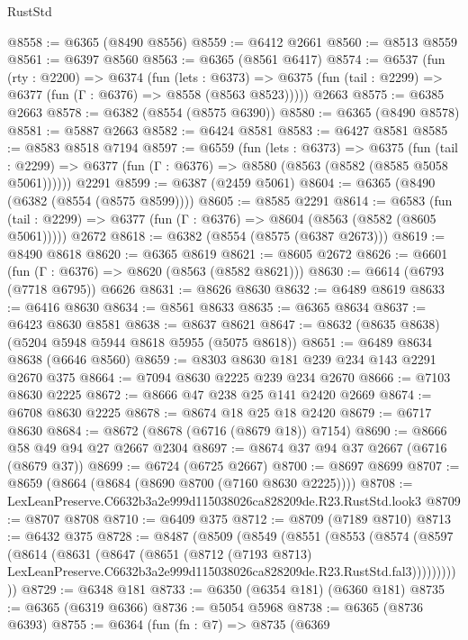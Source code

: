 \begin{lexlean}{RustStd}
\begin{coremodule}
@8558 := @6365 (@8490 @8556)
@8559 := @6412 @2661
@8560 := @8513 @8559
@8561 := @6397 @8560
@8563 := @6365 (@8561 @6417)
@8574 := @6537
    (fun (rty : @2200) =>
    @6374
      (fun (lets : @6373) =>
      @6375 (fun (tail : @2299) => @6377 (fun (Γ : @6376) => @8558 (@8563 @8523)))))
    @2663
@8575 := @6385 @2663
@8578 := @6382 (@8554 (@8575 @6390))
@8580 := @6365 (@8490 @8578)
@8581 := @5887 @2663
@8582 := @6424 @8581
@8583 := @6427 @8581
@8585 := @8583 @8518 @7194
@8597 := @6559
    (fun (lets : @6373) =>
    @6375
      (fun (tail : @2299) => @6377 (fun (Γ : @6376) => @8580 (@8563 (@8582 (@8585 @5058 @5061))))))
    @2291
@8599 := @6387 (@2459 @5061)
@8604 := @6365 (@8490 (@6382 (@8554 (@8575 @8599))))
@8605 := @8585 @2291
@8614 := @6583
    (fun (tail : @2299) => @6377 (fun (Γ : @6376) => @8604 (@8563 (@8582 (@8605 @5061)))))
    @2672
@8618 := @6382 (@8554 (@8575 (@6387 @2673)))
@8619 := @8490 @8618
@8620 := @6365 @8619
@8621 := @8605 @2672
@8626 := @6601 (fun (Γ : @6376) => @8620 (@8563 (@8582 @8621)))
@8630 := @6614 (@6793 (@7718 @6795)) @6626
@8631 := @8626 @8630
@8632 := @6489 @8619
@8633 := @6416 @8630
@8634 := @8561 @8633
@8635 := @6365 @8634
@8637 := @6423 @8630 @8581
@8638 := @8637 @8621
@8647 := @8632 (@8635 @8638) (@5204 @5948 @5944 @8618 @5955 (@5075 @8618))
@8651 := @6489 @8634 @8638 (@6646 @8560)
@8659 := @8303 @8630 @181 @239 @234 @143 @2291 @2670 @375
@8664 := @7094 @8630 @2225 @239 @234 @2670
@8666 := @7103 @8630 @2225
@8672 := @8666 @47 @238 @25 @141 @2420 @2669
@8674 := @6708 @8630 @2225
@8678 := @8674 @18 @25 @18 @2420
@8679 := @6717 @8630
@8684 := @8672 (@8678 (@6716 (@8679 @18)) @7154)
@8690 := @8666 @58 @49 @94 @27 @2667 @2304
@8697 := @8674 @37 @94 @37 @2667 (@6716 (@8679 @37))
@8699 := @6724 (@6725 @2667)
@8700 := @8697 @8699
@8707 := @8659 (@8664 (@8684 (@8690 @8700 (@7160 @8630 @2225))))
@8708 := LexLeanPreserve.C6632b3a2e999d115038026ca828209de.R23.RustStd.look3
@8709 := @8707 @8708
@8710 := @6409 @375
@8712 := @8709 (@7189 @8710)
@8713 := @6432 @375
@8728 := @8487
    (@8509
      (@8549
        (@8551
          (@8553
            (@8574
              (@8597
                (@8614
                  (@8631
                    (@8647
                      (@8651
                        (@8712
                          (@7193 @8713)
                          LexLeanPreserve.C6632b3a2e999d115038026ca828209de.R23.RustStd.fal3)))))))))))
@8729 := @6348 @181
@8733 := @6350 (@6354 @181) (@6360 @181)
@8735 := @6365 (@6319 @6366)
@8736 := @5054 @5968
@8738 := @6365 (@8736 @6393)
@8755 := @6364
    (fun (fn : @7) =>
    @8735
      (@6369

\end{coremodule}
\end{lexlean}

